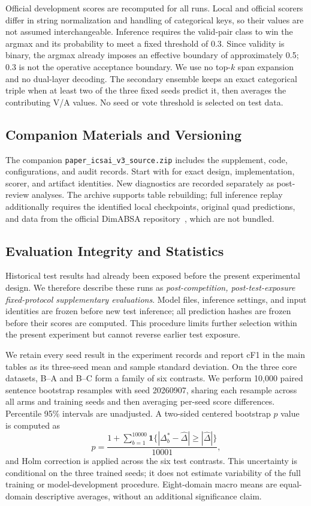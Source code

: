 \documentclass[conference]{IEEEtran}
\begin{document}
Official development scores are recomputed for all runs. Local and official scorers differ in string normalization and handling of categorical keys, so their values are not assumed interchangeable. Inference requires the valid-pair class to win the argmax and its probability to meet a fixed threshold of 0.3. Since validity is binary, the argmax already imposes an effective boundary of approximately 0.5; 0.3 is not the operative acceptance boundary. We use no top-$k$ span expansion and no dual-layer decoding. The secondary ensemble keeps an exact categorical triple when at least two of the three fixed seeds predict it, then averages the contributing V/A values. No seed or vote threshold is selected on test data.

\subsection{Companion Materials and Versioning}
The companion \texttt{paper\_icsai\_v3\_source.zip} includes the supplement, code, configurations, and audit records. Start with  for exact design, implementation, scorer, and artifact identities. New diagnostics are recorded separately as post-review analyses. The archive supports table rebuilding; full inference replay additionally requires the identified local checkpoints, original quad predictions, and data from the official DimABSA repository~\cite{dimabsa2026,overview2026}, which are not bundled.

\subsection{Evaluation Integrity and Statistics}
Historical test results had already been exposed before the present experimental design. We therefore describe these runs as \emph{post-competition, post-test-exposure fixed-protocol supplementary evaluations}. Model files, inference settings, and input identities are frozen before new test inference; all prediction hashes are frozen before their scores are computed. This procedure limits further selection within the present experiment but cannot reverse earlier test exposure.

We retain every seed result in the experiment records and report cF1 in the main tables as its three-seed mean and sample standard deviation. On the three core datasets, B--A and B--C form a family of six contrasts. We perform 10,000 paired sentence bootstrap resamples with seed 20260907, sharing each resample across all arms and training seeds and then averaging per-seed score differences. Percentile 95\% intervals are unadjusted. A two-sided centered bootstrap $p$ value is computed as
\begin{equation}
 p=\frac{1+\sum_{b=1}^{10000}\mathbf{1}\{|\Delta_b^*-\widehat\Delta|\geq|\widehat\Delta|\}}{10001},
\end{equation}
and Holm correction is applied across the six test contrasts. This uncertainty is conditional on the three trained seeds; it does not estimate variability of the full training or model-development procedure. Eight-domain macro means are equal-domain descriptive averages, without an additional significance claim.
\end{document}
